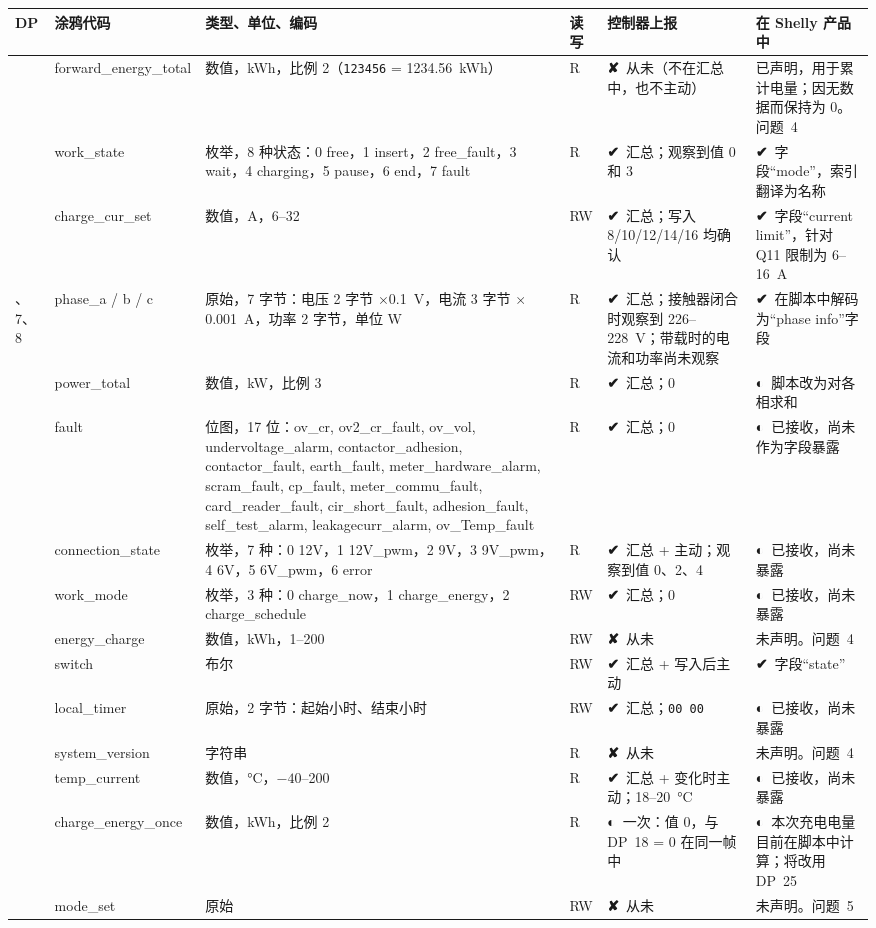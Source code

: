 \documentclass[11pt,a4paper]{article}
\newcommand{\ok}{{\symbolfont\color{apgreen}\textbf{✔}}}
\newcommand{\half}{{\symbolfont\color{apwarn}\textbf{◐}}}
\newcommand{\no}{{\symbolfont\color{apred}\textbf{✘}}}
\newcommand{\hx}[1]{\texttt{#1}}
\begin{document}
\begin{longtable}{>{\raggedright\arraybackslash}p{0.7cm}>{\raggedright\arraybackslash}p{3.1cm}>{\raggedright\arraybackslash}p{3.6cm}>{\raggedright\arraybackslash}p{0.9cm}>{\raggedright\arraybackslash}p{3.2cm}>{\raggedright\arraybackslash}p{3.8cm}}
\toprule
\rowcolor{aphead}\textbf{DP} & \textbf{涂鸦代码} & \textbf{类型、单位、编码} & \textbf{读写} & \textbf{控制器上报} & \textbf{在 Shelly 产品中} \\
\midrule\endhead
\bottomrule\endfoot
1 & forward\_\allowbreak energy\_\allowbreak total & 数值，kWh，比例 2（\hx{123456} = 1234.56~kWh） & R & \no\ 从未（不在汇总中，也不主动） & 已声明，用于累计电量；因无数据而保持为 0。问题~4 \\
3 & work\_state & 枚举，8 种状态：0 free，1 insert，2 free\_fault，3 wait，4 charging，5 pause，6 end，7 fault & R & \ok\ 汇总；观察到值 0 和 3 & \ok\ 字段“mode”，索引翻译为名称 \\
4 & charge\_cur\_set & 数值，A，6--32 & RW & \ok\ 汇总；写入 8/10/12/14/16 均确认 & \ok\ 字段“current limit”，针对 Q11 限制为 6--16~A \\
6、7、8 & phase\_a / b / c & 原始，7 字节：电压 2 字节 $\times$0.1~V，电流 3 字节 $\times$0.001~A，功率 2 字节，单位 W & R & \ok\ 汇总；接触器闭合时观察到 226--228~V；带载时的电流和功率尚未观察 & \ok\ 在脚本中解码为“phase info”字段 \\
9 & power\_total & 数值，kW，比例 3 & R & \ok\ 汇总；0 & \half\ 脚本改为对各相求和 \\
10 & fault & 位图，17 位：ov\_cr, ov2\_cr\_fault, ov\_vol, undervoltage\_alarm, contactor\_adhesion, contactor\_fault, earth\_fault, meter\_hardware\_alarm, scram\_fault, cp\_fault, meter\_commu\_fault, card\_reader\_fault, cir\_short\_fault, adhesion\_fault, self\_test\_alarm, leakagecurr\_alarm, ov\_Temp\_fault & R & \ok\ 汇总；0 & \half\ 已接收，尚未作为字段暴露 \\
13 & connection\_state & 枚举，7 种：0 12V，1 12V\_pwm，2 9V，3 9V\_pwm，4 6V，5 6V\_pwm，6 error & R & \ok\ 汇总 + 主动；观察到值 0、2、4 & \half\ 已接收，尚未暴露 \\
14 & work\_mode & 枚举，3 种：0 charge\_now，1 charge\_energy，2 charge\_schedule & RW & \ok\ 汇总；0 & \half\ 已接收，尚未暴露 \\
17 & energy\_charge & 数值，kWh，1--200 & RW & \no\ 从未 & 未声明。问题~4 \\
18 & switch & 布尔 & RW & \ok\ 汇总 + 写入后主动 & \ok\ 字段“state” \\
19 & local\_timer & 原始，2 字节：起始小时、结束小时 & RW & \ok\ 汇总；\hx{00 00} & \half\ 已接收，尚未暴露 \\
23 & system\_version & 字符串 & R & \no\ 从未 & 未声明。问题~4 \\
24 & temp\_current & 数值，°C，$-40$--200 & R & \ok\ 汇总 + 变化时主动；18--20~°C & \half\ 已接收，尚未暴露 \\
25 & charge\_\allowbreak energy\_\allowbreak once & 数值，kWh，比例 2 & R & \half\ 一次：值 0，与 DP~18 = 0 在同一帧中 & \half\ 本次充电电量目前在脚本中计算；将改用 DP~25 \\
33 & mode\_set & 原始 & RW & \no\ 从未 & 未声明。问题~5 \\
\end{longtable}
\end{document}
